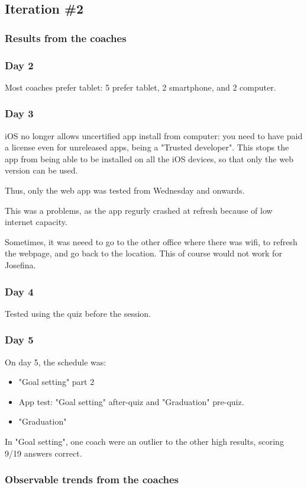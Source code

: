 \subsection{Iteration \#2}


    \subsubsection{Results from the coaches}

    \subsubsection{Day 2}
    Most coaches prefer tablet: 5 prefer tablet, 2 smartphone, and 2 computer.

    \subsubsection{Day 3}
    iOS no longer allows uncertified app install from computer: you need to have paid a license even for unreleased apps, being a "Trusted developer". This stops the app from being able to be installed on all the iOS devices, so that only the web version can be used.

    Thus, only the web app was tested from Wednesday and onwards.

    This was a problems, as the app regurly crashed at refresh because of low internet capacity.

    Sometimes, it was neeed to go to the other office where there was wifi, to refresh the webpage, and go back to the location. This of course would not work for Josefina.

    \subsubsection{Day 4}
    Tested using the quiz before the session.

    \subsubsection{Day 5}
    On day 5, the schedule was:

    \begin{itemize}
      \item "Goal setting" part 2
      \item App test: "Goal setting" after-quiz and "Graduation" pre-quiz.
      \item "Graduation"
    \end{itemize}

    In "Goal setting", one coach were an outlier to the other high results, scoring 9/19 answers correct.

    \subsubsection{Observable trends from the coaches}
